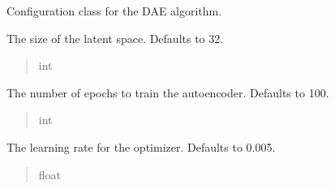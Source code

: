 \documentclass[letterpaper,10pt,english]{sphinxmanual}
\begin{document}
\begin{fulllineitems}
\sphinxAtStartPar
Configuration class for the DAE algorithm.

\begin{fulllineitems}
\label{\detokenize{application.algorithms.dae:application.algorithms.dae.DaeConfiguration.DaeConfiguration.latent_size}}
\pysigstartsignatures
{}
\pysigstopsignatures
\sphinxAtStartPar
The size of the latent space. Defaults to 32.
\begin{quote}\begin{description}
\sphinxAtStartPar
int

\end{description}\end{quote}

\end{fulllineitems}


\begin{fulllineitems}
\label{\detokenize{application.algorithms.dae:application.algorithms.dae.DaeConfiguration.DaeConfiguration.epochs}}
\pysigstartsignatures
{}
\pysigstopsignatures
\sphinxAtStartPar
The number of epochs to train the autoencoder. Defaults to 100.
\begin{quote}\begin{description}
\sphinxAtStartPar
int

\end{description}\end{quote}

\end{fulllineitems}


\begin{fulllineitems}
\label{\detokenize{application.algorithms.dae:application.algorithms.dae.DaeConfiguration.DaeConfiguration.learning_rate}}
\pysigstartsignatures
{}
\pysigstopsignatures
\sphinxAtStartPar
The learning rate for the optimizer. Defaults to 0.005.
\begin{quote}\begin{description}
\sphinxAtStartPar
float


\end{description}
\end{quote}
\end{fulllineitems}
\end{fulllineitems}
\end{document}
